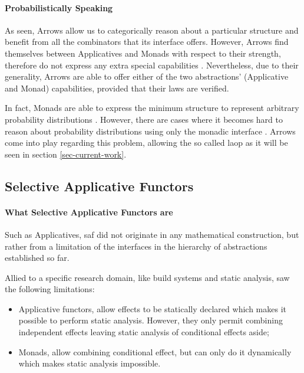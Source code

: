 \documentclass[
  oneside,
  11pt, a4paper,
  footinclude=true,
  headinclude=true,
  cleardoublepage=empty
]{scrbook}
\theoremstyle{definition}
\theoremstyle{definition}
\begin{document}
    	        \paragraph{Probabilistically Speaking}
    	        
    As seen, Arrows allow us to categorically reason about a particular structure and benefit from all the combinators that its interface offers. However, Arrows find themselves between Applicatives and Monads with respect to their strength, therefore do not express any extra special capabilities \citep{Lindley:2011:IOA:1953652.1954016}. Nevertheless, due to their generality, Arrows are able to offer either of the two abstractions' (Applicative and Monad) capabilities, provided that their laws are verified.
    	        
    In fact, Monads are able to express the minimum structure to represent arbitrary probability distributions \citep{jtobin}. However, there are cases where it becomes hard to reason about probability distributions using only the monadic interface \citep{Oliveira2016KeepDC}. Arrows come into play regarding this problem, allowing the so called \gls{laop} \citep{Macedo2012MatricesAA} as it will be seen in section \ref{sec-current-work}.
    	        
	    \subsection{Selective Applicative Functors}
	    
	        \paragraph{What Selective Applicative Functors are}
	       
	Such as Applicatives, \gls{saf} did not originate in any mathematical construction, but rather from a limitation of the interfaces in the hierarchy of abstractions established so far.
	            
	Allied to a specific research domain, like build systems and static analysis, \cite{andrey2019selective} saw the following limitations:
	            
	            \begin{itemize}
	                \item Applicative functors, allow effects to be statically declared which makes it possible to perform static analysis. However, they only permit combining independent effects leaving static analysis of conditional effects aside;
	                \item Monads, allow combining conditional effect, but can only do it dynamically which makes static analysis impossible.
	            \end{itemize}{}
	            
\end{document}
